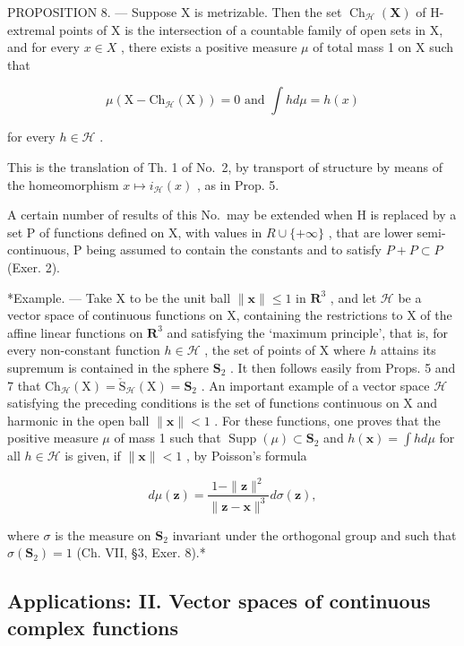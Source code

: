 PROPOSITION 8. --- Suppose X is metrizable. Then the set \(\operatorname{Ch}_{\mathcal{H}}(\mathbf{X})\) of H-extremal points of X is the intersection of a countable family of open sets in X, and for every \(x \in X\) , there exists a positive measure \(\mu\) of total mass 1 on X such that

\[
\mu (\mathrm{X} - \mathrm{Ch} _ {\mathcal {H}} (\mathrm{X})) = 0 \text { and } \int h d \mu = h (x)
\]

for every \(h \in \mathcal{H}\) .

This is the translation of Th. 1 of No.~2, by transport of structure by means of the homeomorphism \(x \mapsto i_{\mathcal{H}}(x)\) , as in Prop. 5.

A certain number of results of this No.~may be extended when H is replaced by a set P of functions defined on X, with values in \(R \cup \{+\infty\}\) , that are lower semi-continuous, P being assumed to contain the constants and to satisfy \(P + P \subset P\) (Exer. 2).

*Example. --- Take X to be the unit ball \(\| \mathbf{x} \| \leqslant 1\) in \(\mathbf{R}^3\) , and let \(\mathcal{H}\) be a vector space of continuous functions on X, containing the restrictions to X of the affine linear functions on \(\mathbf{R}^3\) and satisfying the `maximum principle', that is, for every non-constant function \(h \in \mathcal{H}\) , the set of points of X where \(h\) attains its supremum is contained in the sphere \(\mathbf{S}_2\) . It then follows easily from Props. 5 and 7 that \(\mathrm{Ch}_{\mathcal{H}}(\mathrm{X}) = \check{\mathrm{S}}_{\mathcal{H}}(\mathrm{X}) = \mathbf{S}_2\) . An important example of a vector space \(\mathcal{H}\) satisfying the preceding conditions is the set of functions continuous on X and harmonic in the open ball \(\| \mathbf{x} \| < 1\) . For these functions, one proves that the positive measure \(\mu\) of mass 1 such that \(\operatorname{Supp}(\mu) \subset \mathbf{S}_2\) and \(h(\mathbf{x}) = \int h d\mu\) for all \(h \in \mathcal{H}\) is given, if \(\| \mathbf{x} \| < 1\) , by Poisson's formula

\[
d \mu (\mathbf {z}) = \frac {1 - \| \mathbf {z} \| ^ {2}}{\| \mathbf {z} - \mathbf {x} \| ^ {3}} d \sigma (\mathbf {z}),
\]

where \(\sigma\) is the measure on \(\mathbf{S}_2\) invariant under the orthogonal group and such that \(\sigma(\mathbf{S}_2) = 1\) (Ch. VII, §3, Exer. 8).*

\subsection{Applications: II. Vector spaces of continuous complex functions}

